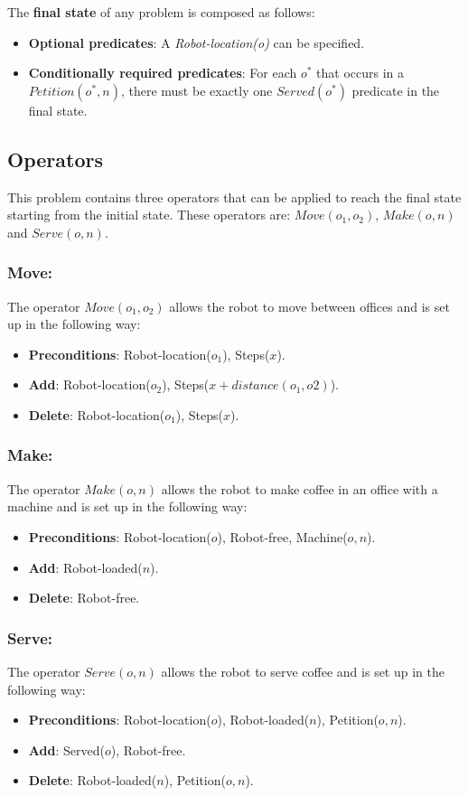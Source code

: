 The \textbf{final state} of any problem is composed as follows:

\begin{itemize}
	\item \textbf{Optional predicates}: A \textit{Robot-location(o)} can be specified.
	\item \textbf{Conditionally required predicates}: For each $o^*$ that occurs in a $ Petition(o^*, n)$, there must be exactly one $ Served(o^*) $ predicate in the final state.
\end{itemize} 
 

\subsection{Operators}
\label{sub:op}

This problem contains three operators that can be applied to reach the final state starting from the initial state. These operators are: $Move(o_1, o_2)$, $Make(o,n)$ and $Serve(o,n)$.
\subsubsection*{Move:}
The operator \textbf{$Move(o_1, o_2)$} allows the robot to move between offices and is set up in the following way:
\begin{itemize}
	\item \textbf{Preconditions}: Robot-location($o_1$), Steps($x$).
	\item \textbf{Add}: Robot-location($o_2$), Steps($x+distance(o_1, o2)$).
	\item \textbf{Delete}: Robot-location($o_1$), Steps($x$).
\end{itemize}

\subsubsection*{Make:}
The operator \textbf{$Make(o, n)$} allows the robot to make coffee in an office with a machine and is set up in the following way:
\begin{itemize}
	\item \textbf{Preconditions}: Robot-location($o$), Robot-free, Machine($o,n$).
	\item \textbf{Add}: Robot-loaded($n$).
	\item \textbf{Delete}: Robot-free.
\end{itemize}

\subsubsection*{Serve:}
The operator \textbf{$Serve(o, n)$} allows the robot to serve coffee and is set up in the following way:
\begin{itemize}
	\item \textbf{Preconditions}: Robot-location($o$), Robot-loaded($n$), Petition($o,n$).
	\item \textbf{Add}:  Served($o$), Robot-free.
	\item \textbf{Delete}: Robot-loaded($n$), Petition($o,n$).
\end{itemize}

